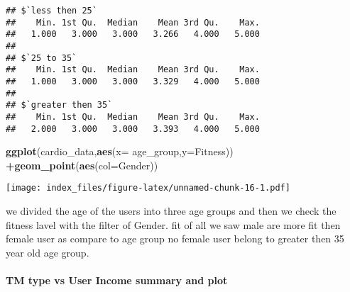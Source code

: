 \documentclass[
]{article}
\newenvironment{Shaded}{\begin{snugshade}}{\end{snugshade}}
\newcommand{\CommentTok}[1]{\textcolor[rgb]{0.56,0.35,0.01}{\textit{#1}}}
\newcommand{\DataTypeTok}[1]{\textcolor[rgb]{0.13,0.29,0.53}{#1}}
\newcommand{\DecValTok}[1]{\textcolor[rgb]{0.00,0.00,0.81}{#1}}
\newcommand{\KeywordTok}[1]{\textcolor[rgb]{0.13,0.29,0.53}{\textbf{#1}}}
\newcommand{\NormalTok}[1]{#1}
\newcommand{\OperatorTok}[1]{\textcolor[rgb]{0.81,0.36,0.00}{\textbf{#1}}}
\newcommand{\StringTok}[1]{\textcolor[rgb]{0.31,0.60,0.02}{#1}}
\begin{document}
\begin{Shaded}
\end{Shaded}

\begin{verbatim}
## $`less then 25`
##    Min. 1st Qu.  Median    Mean 3rd Qu.    Max. 
##   1.000   3.000   3.000   3.266   4.000   5.000 
## 
## $`25 to 35`
##    Min. 1st Qu.  Median    Mean 3rd Qu.    Max. 
##   1.000   3.000   3.000   3.329   4.000   5.000 
## 
## $`greater then 35`
##    Min. 1st Qu.  Median    Mean 3rd Qu.    Max. 
##   2.000   3.000   3.000   3.393   4.000   5.000
\end{verbatim}

\begin{Shaded}
\begin{Highlighting}[]
  \KeywordTok{ggplot}\NormalTok{(cardio_data,}\KeywordTok{aes}\NormalTok{(}\DataTypeTok{x=}\NormalTok{ age_group,}\DataTypeTok{y=}\NormalTok{Fitness)) }\OperatorTok{+}\KeywordTok{geom_point}\NormalTok{(}\KeywordTok{aes}\NormalTok{(}\DataTypeTok{col=}\NormalTok{Gender))}
\end{Highlighting}
\end{Shaded}

\texttt{[image: index\_files/figure-latex/unnamed-chunk-16-1.pdf]}

we divided the age of the users into three age groups and then we check
the fitness lavel with the filter of Gender. fit of all we saw male are
more fit then female user as compare to age group no female user belong
to greater then 35 year old age group.

\hypertarget{tm-type-vs-user-income-summary-and-plot}{%
\paragraph{TM type vs User Income summary and
plot}\label{tm-type-vs-user-income-summary-and-plot}}
\end{document}
